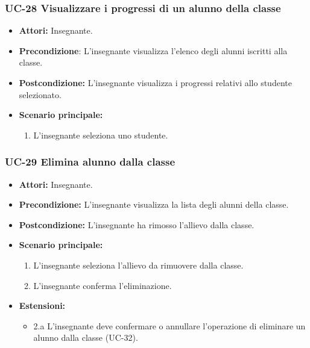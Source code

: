 \subsubsection{UC-28 Visualizzare i progressi di un alunno della classe}
\begin{itemize}
	\item \textbf{Attori:} Insegnante.
	\item \textbf{Precondizione}: L'insegnante visualizza l'elenco degli alunni iscritti alla classe.
	\item \textbf{Postcondizione:} L'insegnante visualizza i progressi relativi allo studente selezionato.
	\item \textbf{Scenario principale:}
	\begin{enumerate}
		\item L'insegnante seleziona uno studente. 
	\end{enumerate}
\end{itemize}

\subsubsection{UC-29 Elimina alunno dalla classe}		
\begin{itemize}
	\item \textbf{Attori:} Insegnante.
	\item \textbf{Precondizione:} L'insegnante visualizza la lista degli alunni della classe.
	\item \textbf{Postcondizione:} L'insegnante ha rimosso l'allievo dalla classe.
	\item \textbf{Scenario principale:}
	\begin{enumerate}
		\item L'insegnante seleziona l'allievo da rimuovere dalla classe.
		\item L'insegnante conferma l'eliminazione.
	\end{enumerate}	
\item \textbf{Estensioni:}
\begin{itemize}
	\item 2.a L'insegnante deve confermare o annullare l'operazione di eliminare un alunno dalla classe (UC-32).
\end{itemize}	
\end{itemize}

